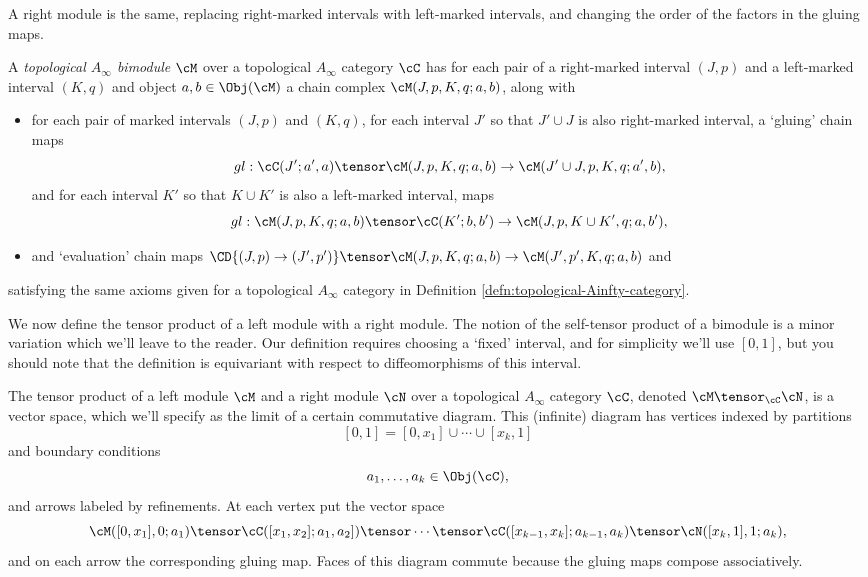 A right module is the same, replacing right-marked intervals with left-marked intervals, and changing the order of the factors in the gluing maps.

\begin{defn}
\label{defn:topological-Ainfty-bimodule}%
A \emph{topological $A_\infty$ bimodule} $\cM$ over a topological $A_\infty$ category $\cC$ has for each pair of a right-marked interval $(J,p)$ and a left-marked interval $(K,q)$ and object $a,b \in \Obj(\cM)$ a chain complex $\cM(J,p,K,q; a,b)$, along with
\begin{itemize}
\item for each pair of marked intervals $(J,p)$ and $(K,q)$, for each interval $J'$ so that $J' \cup J$ is also right-marked interval, a `gluing' chain maps
$$gl: \cC(J';a',a) \tensor \cM(J,p,K,q;a,b) \to \cM(J' \cup J,p,K,q;a',b),$$
and for each interval $K'$ so that $K \cup K'$ is also a left-marked interval, maps
$$gl: \cM(J,p,K,q;a,b) \tensor \cC(K';b,b') \to \cM(J,p,K \cup K',q;a,b'),$$
\item and `evaluation' chain maps $\CD{(J,p) \to (J',p')} \tensor \cM(J,p,K,q;a,b) \to \cM(J',p',K,q;a,b)$ and 
\end{itemize}
satisfying the same axioms given for a topological $A_\infty$ category in Definition \ref{defn:topological-Ainfty-category}.
\end{defn}

We now define the tensor product of a left module with a right module. The notion of the self-tensor product of a bimodule is a minor variation which we'll leave to the reader.
Our definition requires choosing a `fixed' interval, and for simplicity we'll use $[0,1]$, but you should note that the definition is equivariant with respect to diffeomorphisms of this interval.


\begin{defn}
The tensor product of a left module $\cM$ and a right module $\cN$ over a topological $A_\infty$ category $\cC$, denoted $\cM \tensor_{\cC} \cN$, is a vector space, which we'll specify as the limit of a certain commutative diagram. This (infinite) diagram has vertices indexed by partitions $$[0,1] = [0,x_1] \cup \cdots \cup [x_k,1]$$ and boundary conditions $$a_1, \ldots, a_k \in \Obj(\cC),$$ and arrows labeled by refinements. At each vertex put the vector space $$\cM([0,x_1],0; a_1) \tensor \cC([x_1,x_2];a_1,a_2]) \tensor \cdots \tensor \cC([x_{k-1},x_k];a_{k-1},a_k) \tensor \cN([x_k,1],1;a_k),$$ and on each arrow the corresponding gluing map. Faces of this diagram commute because the gluing maps compose associatively.
\end{defn}

